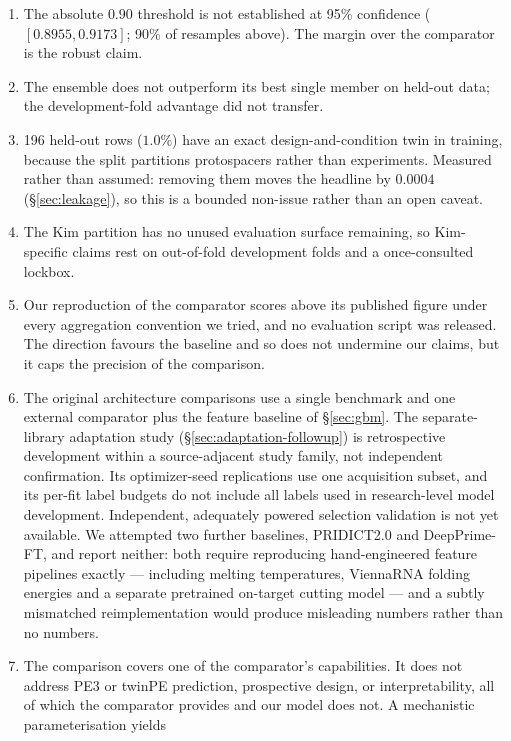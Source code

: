\documentclass[11pt]{article}
\begin{document}
\begin{enumerate}
\item The absolute $0.90$ threshold is not established at 95\% confidence
($[0.8955,0.9173]$; 90\% of resamples above). The margin over the comparator is the
robust claim.
\item The ensemble does not outperform its best single member on held-out data; the
development-fold advantage did not transfer.
\item 196 held-out rows ($1.0\%$) have an exact design-and-condition twin in training,
because the split partitions protospacers rather than experiments. Measured rather than
assumed: removing them moves the headline by $0.0004$ (\S\ref{sec:leakage}), so this is
a bounded non-issue rather than an open caveat.
\item The Kim partition has no unused evaluation surface remaining, so Kim-specific
claims rest on out-of-fold development folds and a once-consulted lockbox.
\item Our reproduction of the comparator scores above its published figure under every
aggregation convention we tried, and no evaluation script was released. The direction
favours the baseline and so does not undermine our claims, but it caps the precision of
the comparison.
\item\label{sec:limitations-baselines} The original architecture comparisons use a
single benchmark and one external comparator plus the feature baseline of
\S\ref{sec:gbm}. The separate-library adaptation study
(\S\ref{sec:adaptation-followup}) is retrospective development within a
source-adjacent study family, not independent confirmation. Its optimizer-seed
replications use one acquisition subset, and its per-fit label budgets do not
include all labels used in research-level model development. Independent,
adequately powered selection validation is not yet available. We attempted two
further baselines, PRIDICT2.0 and DeepPrime-FT, and
report neither: both require reproducing hand-engineered feature pipelines exactly ---
including melting temperatures, ViennaRNA folding energies \citep{lorenz2011} and a
separate pretrained on-target cutting model \citep{kim2019} --- and a subtly mismatched
reimplementation would produce misleading numbers rather than no numbers.
\item The comparison covers one of the comparator's capabilities. It does not address
PE3 or twinPE prediction, prospective design, or interpretability, all of which the
comparator provides and our model does not. A mechanistic parameterisation yields

\end{enumerate}
\end{document}
